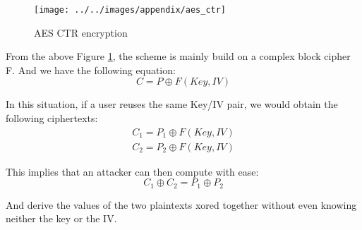 \documentclass[../main.tex]{subfiles}
\begin{document}
\begin{figure}[h]
    \centering
    \texttt{[image: ../../images/appendix/aes\_ctr]}
    
    \caption{AES CTR encryption}
    \label{appendix:figure:aes_ctr}
\end{figure}

\par From the above Figure \ref{appendix:figure:aes_ctr}, the scheme is mainly build on a complex block cipher F. And we have the following equation:
\begin{equation}
    C = P \oplus F(Key, IV)
\end{equation}
\par In this situation, if a user reuses the same Key/IV pair, we would obtain the following ciphertexts:
\begin{equation}
    \begin{split}
        C_1 = P_1 \oplus F(Key, IV)\\
        C_2 = P_2 \oplus F(Key, IV)
    \end{split}
\end{equation}
\par This implies that an attacker can then compute with ease:
\begin{equation}
    C_1 \oplus C_2 = P_1 \oplus P_2
\end{equation}
\par And derive the values of the two plaintexts xored together without even knowing neither the key or the IV.
\end{document}
